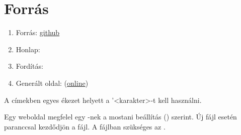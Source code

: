 \chapter{Forr\'as}

\begin{enumerate}
    \item[] Forrás: \href{https://github.com/a-gondolkodas-orome/latex-tutorial}{github} 
    \item[] Honlap: 
    \item[] Fordítás:  
    \item[] Generált oldal:  (\href{https://a-gondolkodas-orome.github.io/latex-tutorial/index.html}{online})
\end{enumerate}
        
A címekben egyes ékezet helyett a  '<karakter>-t kell használni. 

Egy weboldal megfelel egy \code{\chapter}-nek a mostani beállítás () szerint. 
Új fájl esetén  paranccsal kezdődjön a fájl. A  fájlban szükséges az .

